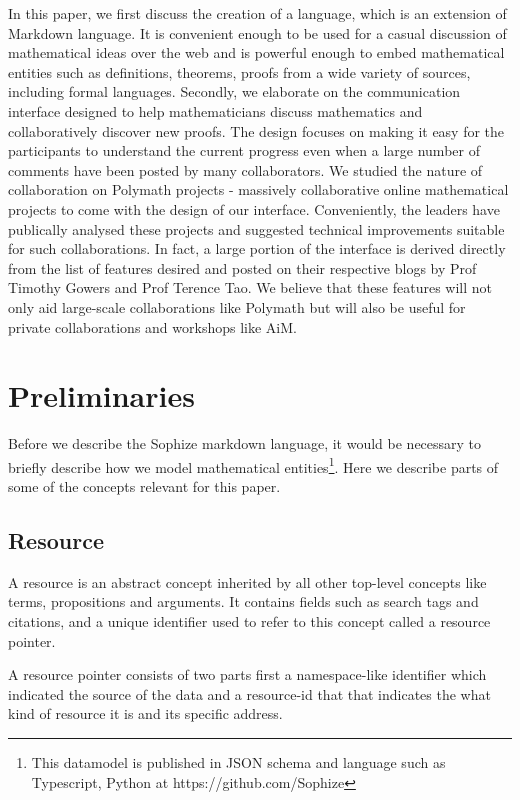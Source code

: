 \documentclass[a4paper]{article}
\begin{document}
In this paper, we first discuss the creation of a language, which is an extension of Markdown language. It is convenient enough to be used for a casual discussion of mathematical ideas over the web and is powerful enough to embed mathematical entities such as definitions, theorems, proofs from a wide variety of sources, including formal languages. Secondly, we elaborate on the communication interface designed to help mathematicians discuss mathematics and collaboratively discover new proofs. The design focuses on making it easy for the participants to understand the current progress even when a large number of comments have been posted by many collaborators. We studied the nature of collaboration on Polymath projects - massively collaborative online mathematical projects to come with the design of our interface. Conveniently, the leaders have publically analysed these projects and suggested technical improvements suitable for such collaborations. In fact, a large portion of the interface is derived directly from the list of features desired and posted on their respective blogs by Prof Timothy Gowers and Prof Terence Tao. We believe that these features will not only aid large-scale collaborations like Polymath but will also be useful for private collaborations and workshops like AiM.


\section{Preliminaries}

Before we describe the Sophize markdown language, it would be necessary to briefly describe how we model mathematical entities\footnote{This datamodel is published in JSON schema and language such as Typescript, Python at https://github.com/Sophize}. Here we describe parts of some of the concepts relevant for this paper.

\subsection*{Resource}
A resource is an abstract concept inherited by all other top-level concepts like terms, propositions and arguments. It contains fields such as search tags and citations, and a unique identifier used to refer to this concept called a resource pointer.

A resource pointer consists of two parts first a namespace-like identifier which indicated the source of the data and a resource-id that that indicates the what kind of resource it is and its specific address.
\end{document}
